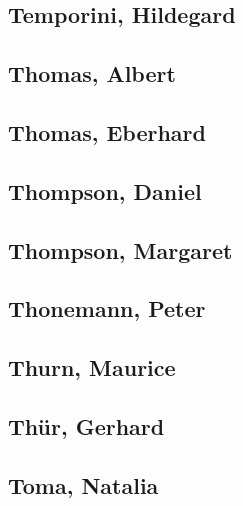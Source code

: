 \subsection[Temporini, Hildegard (1)]{Temporini, Hildegard}

\subsection[Thomas, Albert (1)]{Thomas, Albert}

\subsection[Thomas, Eberhard (1)]{Thomas, Eberhard}

\subsection[Thompson, Daniel (1)]{Thompson, Daniel}

\subsection[Thompson, Margaret (1)]{Thompson, Margaret}

\subsection[Thonemann, Peter (1)]{Thonemann, Peter}

\subsection[Thurn, Maurice (1)]{Thurn, Maurice}

\subsection[Thür, Gerhard (1)]{Thür, Gerhard}

\subsection[Toma, Natalia (4)]{Toma, Natalia}

